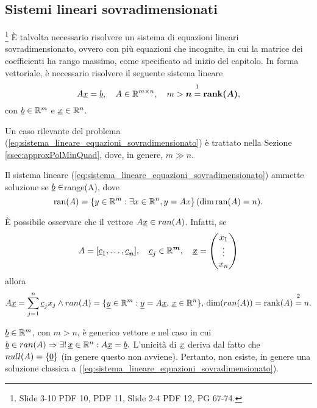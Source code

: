 \subsection{Sistemi lineari sovradimensionati}\label{ssec:sistemi_lineari_sovradimensionati}
\footnote{Slide 3-10 PDF 10, PDF 11, Slide 2-4 PDF 12, PG 67-74.}
È talvolta necessario risolvere un sistema di equazioni lineari sovradimensionato, ovvero con più equazioni che incognite, in cui la matrice dei coefficienti ha rango massimo, come specificato ad inizio del capitolo. In forma vettoriale, è necessario risolvere il seguente sistema lineare
\begin{equation}\label{eq:sistema_lineare_equazioni_sovradimensionato}
    A\uline x =\uline b,\quad A\in\mathbb R^{m\times n},\quad m>\boldsymbol n\overset{\footnotemark}{=}\boldsymbol{\rank(A)},
\end{equation}
con $\uline b\in\mathbb R^m$ e $\uline x\in\mathbb R^n$.

Un caso rilevante del problema (\ref{eq:sistema_lineare_equazioni_sovradimensionato}) è trattato nella Sezione \ref{ssec:approxPolMinQuad}, dove, in genere, $m\gg n$.

Il sistema lineare (\ref{eq:sistema_lineare_equazioni_sovradimensionato}) ammette soluzione se $\uline b\in$\gls{range(A)}, dove
\begin{equation*}
	\operatorname{ran}(A)=\{y\in\mathbb R^m:\exists x\in\mathbb R^n, y=Ax\}\, (\dim\operatorname{ran}(A)=n).
\end{equation*}

È possibile osservare che il vettore $A\uline x\in ran(A)$. Infatti, se
\begin{equation*}
    A=[\uline c_1, \hdots,\uline c_{\boldsymbol n}],\quad \uline c_j\in\mathbb R^{\boldsymbol m},\quad \uline x=
    \begin{pmatrix}
        x_1\\
        \vdots\\
        x_n
    \end{pmatrix}
\end{equation*}
allora
\begin{equation*}
    A\uline x = \sum_{j=1}^n\uline c_j x_j\wedge ran(A)=\{\uline y\in\mathbb R^m:\uline y = A\uline x, \,\uline x\in\mathbb R^n\},\, \dim(ran(A))=\rank(A)\overset{\footnotemark}{=}n.
\end{equation*}

$\uline b\in\mathbb R^m$, con $m>n$, è generico vettore e nel caso in cui $\uline b\in ran(A)\Rightarrow\exists! \,\uline x\in\mathbb R^n:A\uline x=\uline b.$ L'unicità di $\uline x$ deriva dal fatto che $null(A)=\{\uline 0\}$ (in genere questo non avviene). Pertanto, non esiste, in genere una soluzione classica a (\ref{eq:sistema_lineare_equazioni_sovradimensionato}).

